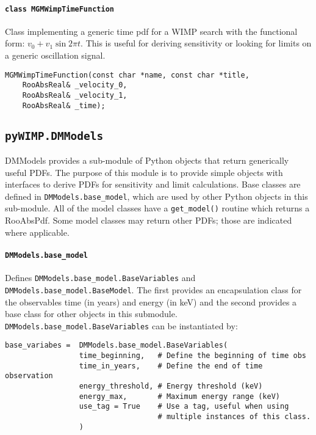 			\paragraph{\lstinline!class MGMWimpTimeFunction!}
Class implementing a generic time pdf for a WIMP search with the functional form: $v_{0} + v_{1}\sin{2\pi t}$.  This is useful for deriving sensitivity or looking for limits on a generic oscillation signal.			
				\begin{lstlisting}
MGMWimpTimeFunction(const char *name, const char *title,
	RooAbsReal& _velocity_0,
	RooAbsReal& _velocity_1,
	RooAbsReal& _time);

				\end{lstlisting}
					
			\lstset{
			   language=Python}							
		\subsection{\texorpdfstring{\lstinline!pyWIMP.DMModels!}{pyWIMP.DMModels}}
		
	DMModels provides a sub-module of Python objects that return generically
useful PDFs.  The purpose of this module is to provide simple objects with
interfaces to derive PDFs for sensitivity and limit calculations.  Base classes
are defined in \lstinline!DMModels.base_model!, which are used by other Python
objects in this sub-module.  All of the model classes have a \lstinline!get_model()!
routine which returns a RooAbsPdf.  Some model classes may return other PDFs; those 
are indicated where applicable.
	
			\paragraph{\lstinline!DMModels.base_model!}
Defines \lstinline!DMModels.base_model.BaseVariables! and
\lstinline!DMModels.base_model.BaseModel!.  The first provides an encapsulation
class for the observables time (in years) and energy (in keV) and the second
provides a base class for other objects in this submodule.
\lstinline!DMModels.base_model.BaseVariables! can be instantiated by:
				\begin{lstlisting}			
base_variabes =  DMModels.base_model.BaseVariables( 
                 time_beginning,   # Define the beginning of time obs
                 time_in_years,    # Define the end of time observation
                 energy_threshold, # Energy threshold (keV)
                 energy_max,       # Maximum energy range (keV)
                 use_tag = True    # Use a tag, useful when using 
                                   # multiple instances of this class.
                 ) 
				\end{lstlisting}				

